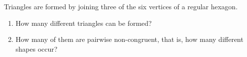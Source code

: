 Triangles are formed by joining three of the six vertices of a regular hexagon.
\begin{enumerate}
\item[(a)] How many different triangles can be formed?
\item[(b)] How many of them are pairwise non-congruent, that is, how many different shapes occur?
\end{enumerate}
